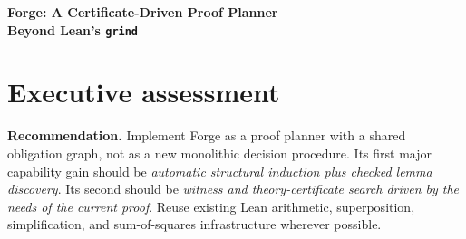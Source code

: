 \documentclass[11pt,a4paper]{article}
\newcommand{\code}[1]{\texttt{#1}}
\begin{document}
\begin{center}
{\LARGE\sffamily\bfseries Forge: A Certificate-Driven Proof Planner\\[5pt] Beyond Lean's \texttt{grind}}\par
\end{center}
\vspace{4mm}
\begin{abstract}
A substantially more capable general-purpose Lean tactic should not replace
\code{grind}'s effective local reasoning with a collection of disconnected
solvers. It should discover the proof structure that makes local reasoning
succeed: the right induction motive, an auxiliary lemma, an existential witness,
a missing theorem instance, a nonlinear inequality certificate, or a necessary
representation bridge. This article specifies \emph{Forge}, a proposed
certificate-driven proof planner that retains \code{grind} as a central engine
and connects these capabilities through a typed, scope-aware graph of facts and
obligations.

The proposal includes concrete search algorithms, certificate formats, Lean
integration boundaries, a dependency and trust policy, worked mathematical
examples, and an implementation roadmap. Five mechanisms are prototyped in
Python: demand-directed Horn reasoning, structural induction with accumulator
lemma synthesis, sparse rational nonnegativity certificates, Bernstein box
certificates, and polynomial witness synthesis. The accompanying suite passes
69 tests; 13 persisted certificate bundles replay using only Python's standard
library. These results validate small algorithmic fragments, not a completed
Lean tactic or a measured advantage over \code{grind}. The Lean reference
scripts are supplied but were not compiled because a Lean runtime was unavailable.
\end{abstract}

\section*{Executive assessment}
\textbf{Recommendation.} Implement Forge as a proof planner with a shared
obligation graph, not as a new monolithic decision procedure. Its first major
capability gain should be \emph{automatic structural induction plus checked
lemma discovery}. Its second should be \emph{witness and theory-certificate
search driven by the needs of the current proof}. Reuse existing Lean arithmetic,
superposition, simplification, and sum-of-squares infrastructure wherever
possible.
\end{document}
